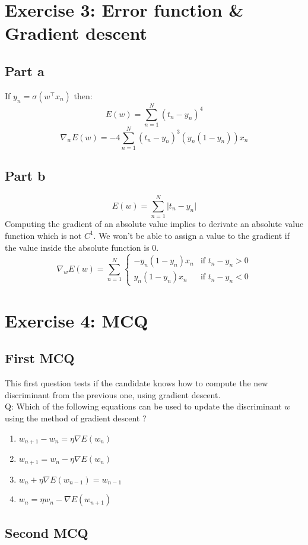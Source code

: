 \documentclass[a4paper, 10pt]{article}
\begin{document}
\section{Exercise 3: Error function \& Gradient descent}
\subsection{Part a}
If $y_n = \sigma(w^\top x_n)$ then:
$$
E(w) = \sum_{n=1}^N (t_n-y_n)^4
$$
$$
\nabla_w E(w) = -4\sum_{n=1}^N (t_n-y_n)^3(y_n (1-y_n))x_n
$$

\subsection{Part b}
$$
E(w) = \sum_{n=1}^N \vert t_n - y_n \vert
$$
Computing the gradient of an absolute value implies to derivate an
absolute value function which  is not $C^1$. We won't be able to assign 
a value to the gradient if the value inside the absolute function is 0.
$$
\nabla_w E(w) = \sum_{n=1}^N \left\{ \begin{array}{ll}  
                    -y_n(1-y_n)x_n & \text{if $t_n-y_n > 0$}
                \\ 
                    y_n(1-y_n)x_n & \text{if $t_n-y_n < 0$}
                        \end{array}
                \right.
$$

\section{Exercise 4: MCQ}
\subsection{First MCQ}
This first question tests if the candidate knows how to compute the new
discriminant from the previous one, using gradient descent.
\\
Q: Which of the following equations can be used to update the discriminant $w$ using
the method of gradient descent ?
\\
\begin{enumerate}
    \item $w_{n+1} - w_{n} =  \eta \nabla E(w_{n})$
    \item $w_{n+1} = w_{n} - \eta \nabla E(w_{n})$
    \item $w_{n} + \eta \nabla E(w_{n-1}) = w_{n-1} $
    \item $w_{n} = \eta w_{n} - \nabla E(w_{n+1})$
\end{enumerate}
\subsection{Second MCQ}
\end{document}
